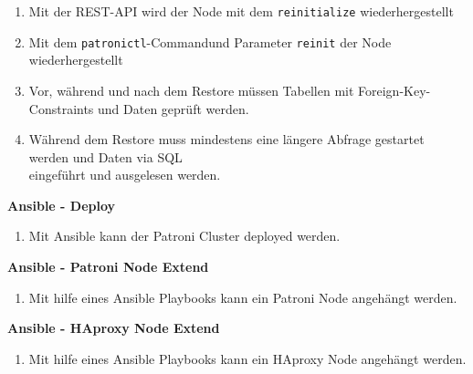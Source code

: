 \begin{flushleft}
\begin{description}
\begin{enumerate}[resume]
            \item Mit der REST-API wird der Node mit dem \texttt{reinitialize} wiederhergestellt
            \item Mit dem \texttt{patronictl}-Commandund Parameter \texttt{reinit} der Node wiederhergestellt
            \item Vor, während und nach dem Restore müssen Tabellen mit Foreign-Key-Constraints und Daten geprüft werden.
            \item Während dem Restore muss mindestens eine längere Abfrage gestartet werden und Daten via SQL\\eingeführt und ausgelesen werden.
        \end{enumerate}
        \item \textbf{Ansible - Deploy}\hfill \\
        \begin{enumerate}[resume]
            \item Mit \Gls{Ansible} kann der Patroni Cluster deployed werden.
        \end{enumerate}
        \item \textbf{Ansible - Patroni Node Extend}\hfill \\
        \begin{enumerate}[resume]
            \item Mit hilfe eines \Gls{Ansible} Playbooks kann ein Patroni Node angehängt werden.
        \end{enumerate}
        \item \textbf{Ansible - HAproxy Node Extend}\hfill \\
        \begin{enumerate}[resume]
            \item Mit hilfe eines \Gls{Ansible} Playbooks kann ein HAproxy Node angehängt werden.
        \end{enumerate}
    \end{description}
\end{flushleft}